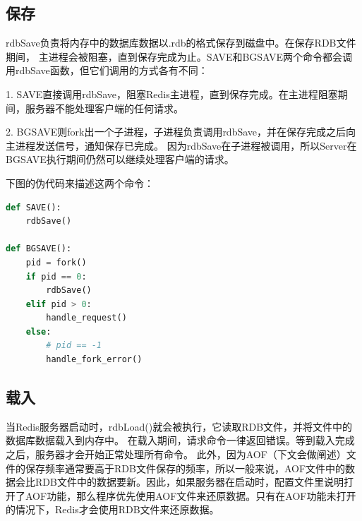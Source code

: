 \documentclass{zjutthesis}
\begin{document}
\subsection{保存}
rdbSave负责将内存中的数据库数据以.rdb的格式保存到磁盘中。在保存RDB文件期间，
主进程会被阻塞，直到保存完成为止。SAVE和BGSAVE两个命令都会调用rdbSave函数，但它们调用的方式各有不同：

1. SAVE直接调用rdbSave，阻塞Redis主进程，直到保存完成。在主进程阻塞期间，服务器不能处理客户端的任何请求。

2. BGSAVE则fork出一个子进程，子进程负责调用rdbSave，并在保存完成之后向主进程发送信号，通知保存已完成。
因为rdbSave在子进程被调用，所以Server在BGSAVE执行期间仍然可以继续处理客户端的请求。

下图的伪代码来描述这两个命令：
\begin{lstlisting}[language=Python]
def SAVE():
    rdbSave()

def BGSAVE():
    pid = fork()
    if pid == 0:
        rdbSave()
    elif pid > 0:
        handle_request()
    else:
        # pid == -1
        handle_fork_error()
\end{lstlisting}

\subsection{载入}
当Redis服务器启动时，rdbLoad()就会被执行，它读取RDB文件，并将文件中的数据库数据载入到内存中。
在载入期间，请求命令一律返回错误。等到载入完成之后，服务器才会开始正常处理所有命令。
此外，因为AOF（下文会做阐述）文件的保存频率通常要高于RDB文件保存的频率，所以一般来说，AOF文件中的数据会比RDB文件中的数据要新。因此，如果服务器在启动时，配置文件里说明打开了AOF功能，那么程序优先使用AOF文件来还原数据。只有在AOF功能未打开的情况下，Redis才会使用RDB文件来还原数据。
\end{document}
